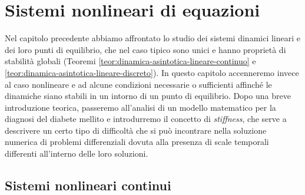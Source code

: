 \graphicspath{{./figures/capitolo6/}}
\lstset{inputpath = ./programs/capitolo6}

\chapter{Sistemi nonlineari di equazioni}

Nel capitolo precedente abbiamo affrontato lo studio dei sistemi dinamici
lineari e dei loro punti di equilibrio, che nel caso tipico sono unici
e hanno proprietà di stabilità globali
(Teoremi \ref{teor:dinamica-asintotica-lineare-continuo}
e \ref{teor:dinamica-asintotica-lineare-discreto}).
In questo capitolo accenneremo invece al caso nonlineare e ad
alcune condizioni necessarie o sufficienti affinché le dinamiche
siano stabili in un intorno di un punto di equilibrio.
Dopo una breve introduzione teorica, passeremo all'analisi di un
modello matematico per la diagnosi del diabete mellito
e introdurremo il concetto di \emph{stiffness},
che serve a descrivere un certo tipo di difficoltà che si può incontrare
nella soluzione numerica di problemi differenziali dovuta alla presenza
di scale temporali differenti all'interno delle loro soluzioni.

\section{Sistemi nonlineari continui}


